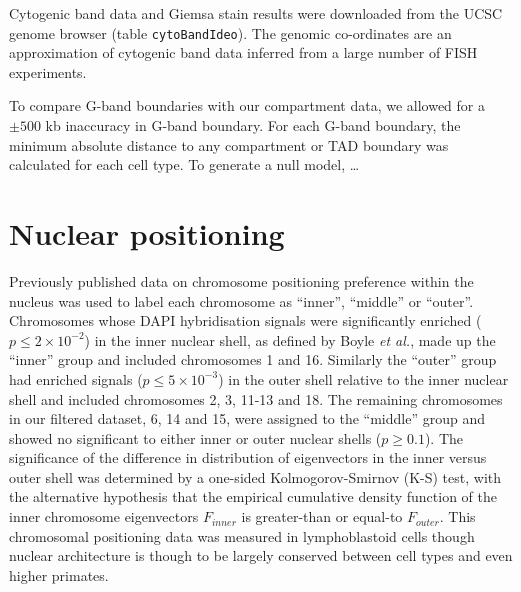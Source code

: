 \documentclass[a4paper,10pt,oneside]{book}
\begin{document}
Cytogenic band data and Giemsa stain results were downloaded from the
UCSC genome browser (table \texttt{cytoBandIdeo}). The genomic
co-ordinates are an approximation of cytogenic band data inferred from a
large number of FISH experiments.\citep{Furey2003}

To compare G-band boundaries with our compartment data, we allowed for a
$\pm 500$ kb inaccuracy in G-band boundary. For each G-band boundary,
the minimum absolute distance to any compartment or TAD boundary was
calculated for each cell type. To generate a null model, \ldots

\section{Nuclear positioning}
Previously published data  on chromosome positioning preference within
the nucleus was used to label each chromosome as ``inner'', ``middle''
or ``outer''.\cite{Boyle2001} Chromosomes whose DAPI hybridisation
signals were significantly enriched ($p\leq 2\times10^{-2}$) in the inner nuclear shell, as
defined by Boyle \emph{et al.}\cite{Boyle2001}, made up the ``inner''
group and included chromosomes 1 and 16. Similarly the ``outer'' group
had enriched signals ($p\leq 5\times10^{-3}$) in the outer shell relative to the inner nuclear
shell and included chromosomes 2, 3, 11-13 and 18. The remaining
chromosomes in our filtered dataset, 6, 14 and 15, were assigned to
the ``middle'' group and showed no significant to either inner or
outer nuclear shells ($p \geq 0.1$).\cite{Boyle2001} The significance
of the difference in distribution of eigenvectors in the inner
versus outer shell was determined by a one-sided Kolmogorov-Smirnov (K-S)
test, with the alternative hypothesis that the empirical cumulative
density function of the inner chromosome eigenvectors $F_{inner}$
is greater-than or equal-to $F_{outer}$. This chromosomal positioning data was measured in lymphoblastoid
cells though nuclear architecture is though to be largely conserved
between cell types\cite{Chambers2013, DeWit2013} and even higher primates.\cite{Tanabe2002}

\begin{small}

\end{small}
\end{document}
